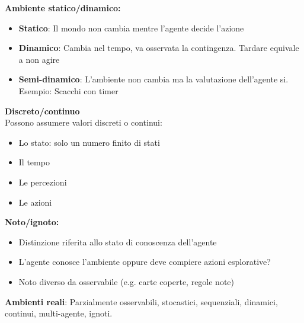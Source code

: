 \documentclass[../main.tex]{subfiles}
\begin{document}
	\textbf{Ambiente statico/dinamico:}
	\begin{itemize}
		\item \textbf{Statico}: Il mondo non cambia mentre l’agente decide l’azione
		\item \textbf{Dinamico}: Cambia nel tempo, va osservata la contingenza. Tardare equivale a non agire
		\item \textbf{Semi-dinamico}: L’ambiente non cambia ma la valutazione dell’agente si. Esempio: Scacchi con timer
	\end{itemize}
	\textbf{Discreto/continuo}\\
	Possono assumere valori discreti o continui:
	\begin{itemize}
		\item Lo stato: solo un numero finito di stati
		\item Il tempo
		\item Le percezioni
		\item Le azioni
	\end{itemize}
	\textbf{Noto/ignoto:}
	\begin{itemize}
		\item Distinzione riferita allo stato di conoscenza dell’agente
		\item L’agente conosce l’ambiente oppure deve compiere azioni esplorative?
		\item Noto diverso da osservabile (e.g. carte coperte, regole note)
	\end{itemize}
	\textbf{Ambienti reali}: Parzialmente osservabili, stocastici, sequenziali, dinamici, continui, multi-agente, ignoti.
\end{document}
